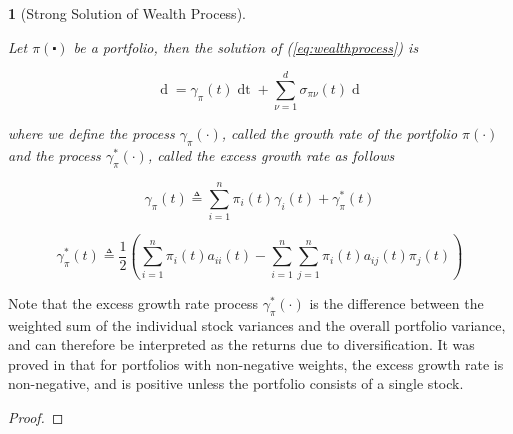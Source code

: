 \documentclass[british]{amsart} \usepackage{lmodern}
\numberwithin{equation}{section} \numberwithin{figure}{section}
\theoremstyle{plain} \newtheorem{thm}{\protect\theoremname}[section]
\theoremstyle{definition} \newtheorem{defn}[thm]{\protect\definitionname}
\theoremstyle{plain} \newtheorem{assumption}[thm]{\protect\assumptionname}
\theoremstyle{plain} \newtheorem{lem}[thm]{\protect\lemmaname}
\theoremstyle{plain} \newtheorem{prop}[thm]{\protect\propositionname}
\theoremstyle{remark} \newtheorem{rem}[thm]{\protect\remarkname}
\theoremstyle{plain} \newtheorem{cor}[thm]{\protect\corollaryname}
\renewcommand{\d}[1]{\mathop{\mathrm{d}{#1}}}
\newcommand{\defeq}{\mathop{\triangleq}} \newcommand{\almostsurely}{\text{a.s.}}
\begin{document}
\begin{prop} [Strong Solution of Wealth Process]
  \label{prop:solutionofwealthprocess}


  Let $\pi(\centerdot)$ be a portfolio, then the solution of
  (\ref{eq:wealthprocess}) is

  \begin{equation}
    \label{eq:wealthprocess}
    \d{V^{w,\pi}(t)} =  
        \gamma_{\pi}(t) \d{t} +
        \sum_{\nu=1}^{d} \sigma_{\pi\nu}(t) \d{W_{\nu}(t)}
  \end{equation}

%

  where we define the process $\gamma_{\pi}(\cdot)$, called the \textit{growth
  rate} of the portfolio $\pi(\cdot)$ and the process $\gamma_{\pi}^{*}(\cdot)$,
  called the \textit{excess growth rate} as follows

  \begin{equation*}
    \gamma_{\pi}(t) \defeq 
      \sum_{i=1}^{n} \pi_{i}(t)\gamma_{i}(t) + 
      \gamma_{\pi}^{*}(t)
  \end{equation*}

  \begin{equation*}
    \gamma_{\pi}^{*}(t) \defeq \frac{1}{2} 
        \left(
          \sum_{i=1}^{n} \pi_{i}(t)a_{ii}(t) -
          \sum_{i=1}^{n} \sum_{j=1}^{n} \pi_{i}(t)a_{ij}(t)\pi_{j}(t)
        \right)
  \end{equation*}

\end{prop}

Note that the excess growth rate process $\gamma_{\pi}^{*}(\cdot)$ is the
difference between the weighted sum of the individual stock variances and the
overall portfolio variance, and can therefore be interpreted as the returns due
to diversification. It was proved in \cite{fernholz1999diversity} that for
portfolios with non-negative weights, the excess growth rate is non-negative,
and is positive unless the portfolio consists of a single stock.

\begin{proof}

\end{proof}
\end{document}
